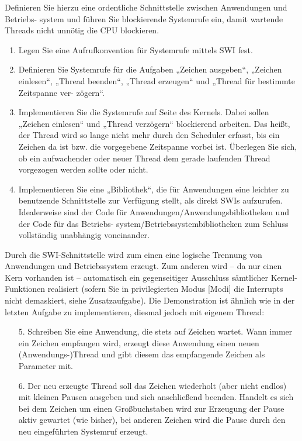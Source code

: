 \begin{description}
Definieren Sie hierzu eine ordentliche Schnittstelle zwischen Anwendungen und Betriebs-
system und führen Sie blockierende Systemrufe ein, damit wartende Threads nicht unnötig die CPU blockieren. 
\begin{enumerate}[label=\arabic*.]
  \item Legen Sie eine Aufrufkonvention für Systemrufe mittels SWI fest. 
  \item Definieren Sie Systemrufe für die Aufgaben „Zeichen ausgeben“, „Zeichen einlesen“, 
„Thread beenden“, „Thread erzeugen“ und „Thread für bestimmte Zeitspanne ver-
zögern“. 
  \item Implementieren Sie die Systemrufe auf Seite des Kernels. Dabei sollen „Zeichen 
einlesen“ und „Thread verzögern“ blockierend arbeiten. Das heißt, der Thread wird so 
lange nicht mehr durch den Scheduler erfasst, bis ein Zeichen da ist bzw. die 
vorgegebene Zeitspanne vorbei ist. Überlegen Sie sich, ob ein aufwachender oder 
neuer Thread dem gerade laufenden Thread vorgezogen werden sollte oder nicht. 
  \item Implementieren Sie eine „Bibliothek“, die für Anwendungen eine leichter zu benutzende 
Schnittstelle zur Verfügung stellt, als direkt SWIs aufzurufen. Idealerweise sind der 
Code für Anwendungen/Anwendungsbibliotheken und der Code für das Betriebs-
system/Betriebssystembibliotheken zum Schluss vollständig unabhängig voneinander. 
\end{enumerate}
Durch die SWI-Schnittstelle wird zum einen eine logische Trennung von Anwendungen und 
Betriebssystem erzeugt. Zum anderen wird – da nur einen Kern vorhanden ist – automatisch 
ein gegenseitiger Ausschluss sämtlicher Kernel-Funktionen realisiert (sofern Sie in 
privilegierten Modus [Modi] die Interrupts nicht demaskiert, siehe Zusatzaufgabe). 
Die Demonstration ist ähnlich wie in der letzten Aufgabe zu implementieren, diesmal jedoch mit 
eigenem Thread: 
\begin{enumerate}
  \item[5.] Schreiben Sie eine Anwendung, die stets auf Zeichen wartet. Wann immer ein Zeichen 
empfangen wird, erzeugt diese Anwendung einen neuen (Anwendungs-)Thread und 
gibt diesem das empfangende Zeichen als Parameter mit. 
  \item[6.] Der neu erzeugte Thread soll das Zeichen wiederholt (aber nicht endlos) mit kleinen 
Pausen ausgeben und sich anschließend beenden. Handelt es sich bei dem Zeichen 
um einen Großbuchstaben wird zur Erzeugung der Pause aktiv gewartet (wie bisher), 
bei anderen Zeichen wird die Pause durch den neu eingeführten Systemruf erzeugt. 

\end{enumerate}
\end{description}
